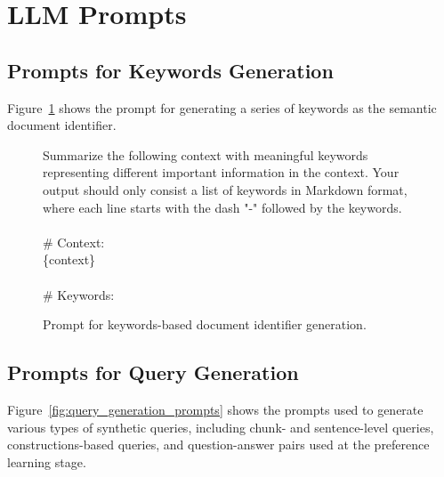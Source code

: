 
\section{LLM Prompts}

\subsection{Prompts for Keywords Generation}
Figure~\ref{fig:keyword_generation} shows the prompt for generating a series of keywords as the semantic document identifier.

\begin{figure}[h]
\begin{tcolorbox}[title=\textbf{Keywords Generation Prompt}]
Summarize the following context with meaningful keywords representing different important information in the context. Your output should only consist a list of keywords in Markdown format, where each line starts with the dash "-" followed by the keywords.
\\
\\
\# Context:\\
\{context\}\\
\\
\# Keywords:
\end{tcolorbox}
\caption{Prompt for keywords-based document identifier generation.}
\label{fig:keyword_generation}
\end{figure}


\subsection{Prompts for Query Generation}
Figure~\ref{fig:query_generation_prompts} shows the prompts used to generate various types of synthetic queries, including chunk- and sentence-level queries, constructions-based queries, and question-answer pairs used at the preference learning stage.










